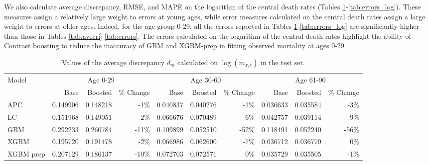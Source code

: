 \documentclass[fleqn,10pt]{wlscirep}
\begin{document}
%
\color{blue}
We also calculate average discrepancy, RMSE, and MAPE on the logarithm of the central death rates (Tables \ref{tab:avecri_log}-\ref{tab:errors_log}). 
These measures assign a relatively large weight to errors at young ages, while error measures calculated on the central death rates assign a large weight to errors at older ages.
Indeed, for the age group 0-29, all the errors reported in Tables \ref{tab:avecri_log}-\ref{tab:errors_log} are significantly higher than those in Tables \ref{tab:avecri}-\ref{tab:errors}. 
The errors calculated on the logarithm of the central death rates highlight the ability of Contrast boosting to reduce the inaccuracy of GBM and XGBM-prep in fitting observed mortality at ages 0-29.\color{black} 
%
\begin{table}[ht]
\centering
\footnotesize
\begin{tabular}{|l|r|r|r|r|r|r|r|r|r|}
\hline
\multirow{2}{*}{Model} & \multicolumn{3}{c|}{Age 0-29} & \multicolumn{3}{c|}{Age 30-60} & \multicolumn{3}{c|}{Age 61-90} \\
\cline{2-10}
			&	Base 	&	Boosted 	& \% Change &	Base 	&	Boosted 	& \% Change &	Base 	&	Boosted	& \% Change\\
\hline
APC 			&	0.149906	&	0.148218	&	-1\%		&	0.040837	&	0.040276		&	-1\%		&	0.036633	&	0.035584	&	-3\%	\\
LC 			&	0.151968	&	0.149051	&	-2\%		&	0.066676	&	0.070489		&	6\%		&	0.042757	&	0.039114	&	-9\%	\\
GBM 		&	0.292233	&	0.260784	&	-11\%	&	0.109899	&	0.052510		&	-52\%	&	0.118491	&	0.052240	&	-56\% \\
XGBM 		&	0.195720	&	0.191478	&	-2\%		&	0.066986	&	0.062600		&	-7\%		&	0.036712	&	0.036779	&	0\%	\\
XGBM prep 	&	0.207129	&	0.186137	&	-10\%	&	0.072703	&	0.072571		&	0\%		&	0.035729	&	0.035505	&	-1\%	\\
\hline
\end{tabular}
\caption{Values of the average discrepancy $\bar{d}_m$ calculated on $\log{\left(m_{x,t}\right)}$ in the test set.}
\label{tab:avecri_log}
\end{table}\\
%
\end{document}
